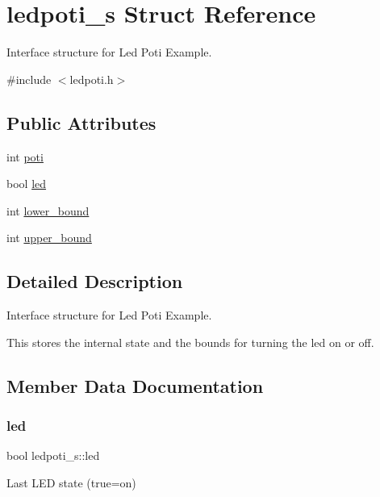\hypertarget{structledpoti__s}{}\section{ledpoti\+\_\+s Struct Reference}
\label{structledpoti__s}


Interface structure for Led Poti Example.  




{\ttfamily \#include $<$ledpoti.\+h$>$}

\subsection*{Public Attributes}
\begin{DoxyCompactItemize}
\item 
int \hyperlink{structledpoti__s_a68de5489c63aee62e5da18f9b4fe6fa9}{poti}
\item 
bool \hyperlink{structledpoti__s_a323939ea414113ee4c4ab2459c593886}{led}
\item 
int \hyperlink{structledpoti__s_a877ef064792684db1fe8ca3b9af45897}{lower\+\_\+bound}
\item 
int \hyperlink{structledpoti__s_a13828b9c632c6ad2497be31aeeaa991b}{upper\+\_\+bound}
\end{DoxyCompactItemize}


\subsection{Detailed Description}
Interface structure for Led Poti Example. 

This stores the internal state and the bounds for turning the led on or off. 

\subsection{Member Data Documentation}
\mbox{\label{structledpoti__s_a323939ea414113ee4c4ab2459c593886}} 
\subsubsection{\texorpdfstring{led}{led}}
{\footnotesize\ttfamily bool ledpoti\+\_\+s\+::led}

Last L\+ED state (true=on) \mbox{\label{structledpoti__s_a877ef064792684db1fe8ca3b9af45897}} 
